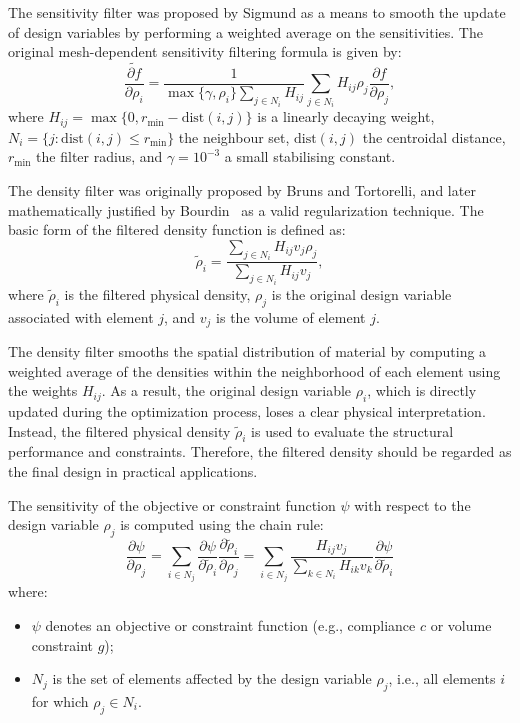 \documentclass[mathpazo]{cicp}
\begin{document}
The sensitivity filter was proposed by Sigmund\cite{sigmund1997design} as a means to smooth the update of design variables by performing a weighted average on the sensitivities. The original mesh-dependent sensitivity filtering formula is given by:
\begin{equation*}
	\widetilde{\frac{\partial{f}}{\partial\rho_i}} = \frac{1}{\max\{\gamma,\rho_i\}\sum_{j\in{N}_i}H_{ij}}
	\sum_{j\in{N}_i}H_{ij}\rho_j\frac{\partial{f}}{\partial\rho_j},
\end{equation*}
where $H_{ij} = \max\{0, r_{\min}-\text{dist}(i,j)\}$ is a linearly decaying weight, $N_i = \{j : \text{dist}(i,j) \leq r_{\min} \}$ the neighbour set, $\text{dist}(i,j)$ the centroidal distance, $r_{\min}$ the filter radius, and $\gamma = 10^{-3}$ a small stabilising constant.

The density filter was originally proposed by Bruns and Tortorelli\cite{bruns2001topology}, and later mathematically justified by Bourdin~\cite{bourdin2001filters} as a valid regularization technique. The basic form of the filtered density function is defined as:
\begin{equation*}
	\tilde\rho_i = \frac{\sum_{j\in{N}_i}H_{ij}v_j\rho_j}{\sum_{j\in{N}_i}H_{ij}v_j},
\end{equation*}
where $\tilde{\rho}_i$ is the filtered physical density, $\rho_j$ is the original design variable associated with element $j$, and $v_j$ is the volume of element $j$.

The density filter smooths the spatial distribution of material by computing a weighted average of the densities within the neighborhood of each element using the weights $H_{ij}$. As a result, the original design variable $\rho_i$, which is directly updated during the optimization process, loses a clear physical interpretation. Instead, the filtered physical density $\tilde{\rho}_i$ is used to evaluate the structural performance and constraints. Therefore, the filtered density should be regarded as the final design in practical applications.

The sensitivity of the objective or constraint function $\psi$ with respect to the design variable $\rho_j$ is computed using the chain rule:
\begin{equation*}
	\frac{\partial\psi}{\partial{\rho}_j} = \sum_{i\in{N}_j}\frac{\partial\psi}{\partial\tilde\rho_i}\frac{\partial\tilde\rho_i}{\partial\rho_j} = \sum_{i\in{N}_j}\frac{H_{ij}v_j}{\sum_{k\in{N}_i}H_{ik}v_k}\frac{\partial\psi}{\partial\tilde\rho_i}
\end{equation*}
where:
\begin{itemize} 
	\item $\psi$ denotes an objective or constraint function (e.g., compliance $c$ or volume constraint $g$);
	\item $N_j$ is the set of elements affected by the design variable $\rho_j$, i.e., all elements $i$ for which $\rho_j \in N_i$. 
\end{itemize}
\end{document}
